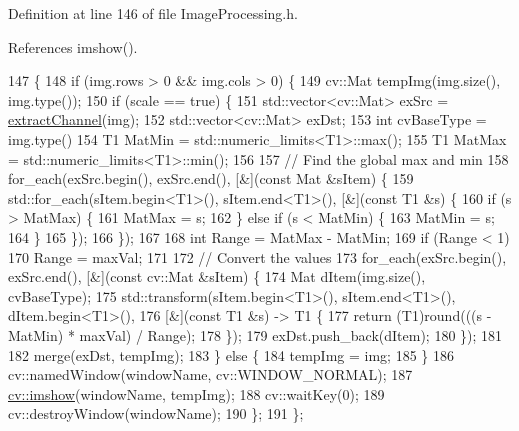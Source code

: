 Definition at line 146 of file Image\+Processing.\+h.



References imshow().


\begin{DoxyCode}
147                                               \{
148     \textcolor{keywordflow}{if} (img.rows > 0 && img.cols > 0) \{
149       cv::Mat tempImg(img.size(), img.type());
150       \textcolor{keywordflow}{if} (scale == \textcolor{keyword}{true}) \{
151         std::vector<cv::Mat> exSrc = \hyperlink{class_vision_1_1_image_processing_ad5fa51caaabb8cb0fc2c15f645695a3c}{extractChannel}(img);
152         std::vector<cv::Mat> exDst;
153         \textcolor{keywordtype}{int} cvBaseType = img.type() %
154         T1 MatMin = std::numeric\_limits<T1>::max();
155         T1 MatMax = std::numeric\_limits<T1>::min();
156 
157         \textcolor{comment}{// Find the global max and min}
158         for\_each(exSrc.begin(), exSrc.end(), [&](\textcolor{keyword}{const} Mat &sItem) \{
159           std::for\_each(sItem.begin<T1>(), sItem.end<T1>(), [&](\textcolor{keyword}{const} T1 &s) \{
160             if (s > MatMax) \{
161               MatMax = s;
162             \} \textcolor{keywordflow}{else} if (s < MatMin) \{
163               MatMin = s;
164             \}
165           \});
166         \});
167 
168         \textcolor{keywordtype}{int} Range = MatMax - MatMin;
169         \textcolor{keywordflow}{if} (Range < 1)
170           Range = maxVal;
171 
172         \textcolor{comment}{// Convert the values}
173         for\_each(exSrc.begin(), exSrc.end(), [&](\textcolor{keyword}{const} cv::Mat &sItem) \{
174           Mat dItem(img.size(), cvBaseType);
175           std::transform(sItem.begin<T1>(), sItem.end<T1>(), dItem.begin<T1>(),
176                          [&](\textcolor{keyword}{const} T1 &s) -> T1 \{
177                            return (T1)round(((s - MatMin) * maxVal) / Range);
178                          \});
179           exDst.push\_back(dItem);
180         \});
181 
182         merge(exDst, tempImg);
183       \} \textcolor{keywordflow}{else} \{
184         tempImg = img;
185       \}
186       cv::namedWindow(windowName, cv::WINDOW\_NORMAL);
187       \hyperlink{_comparision_pictures_2_createtest_image_8m_ab203292116da4a8a72763ec58b04da8f}{cv::imshow}(windowName, tempImg);
188       cv::waitKey(0);
189       cv::destroyWindow(windowName);
190     \};
191   \};
\end{DoxyCode}


